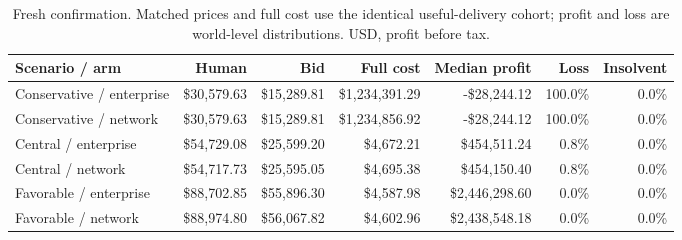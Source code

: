 \begin{table}[!htbp]\centering\small
\caption{Fresh confirmation. Matched prices and full cost use the identical useful-delivery cohort; profit and loss are world-level distributions. USD, profit before tax.}
\begin{tabularx}{\linewidth}{Yrrrrrr}\toprule
Scenario / arm & Human & Bid & Full cost & Median profit & Loss & Insolvent\\\midrule
Conservative / enterprise & \$30,579.63 & \$15,289.81 & \$1,234,391.29 & -\$28,244.12 & 100.0\% & 0.0\%\\
Conservative / network & \$30,579.63 & \$15,289.81 & \$1,234,856.92 & -\$28,244.12 & 100.0\% & 0.0\%\\
Central / enterprise & \$54,729.08 & \$25,599.20 & \$4,672.21 & \$454,511.24 & 0.8\% & 0.0\%\\
Central / network & \$54,717.73 & \$25,595.05 & \$4,695.38 & \$454,150.40 & 0.8\% & 0.0\%\\
Favorable / enterprise & \$88,702.85 & \$55,896.30 & \$4,587.98 & \$2,446,298.60 & 0.0\% & 0.0\%\\
Favorable / network & \$88,974.80 & \$56,067.82 & \$4,602.96 & \$2,438,548.18 & 0.0\% & 0.0\%\\
\bottomrule
\end{tabularx}
\par{}\par
\end{table}
